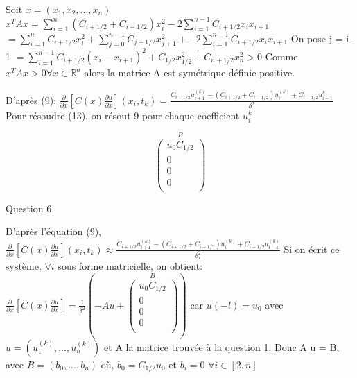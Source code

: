 \documentclass[a4paper,11pt]{article}
\newcommand{\R}{\mathbb{R}}
\theoremstyle{nonumberplain}
\theoremstyle{nonumberplain}
\theoremstyle{nonumberplain}
\begin{document}
    Soit $x = (x_1, x_2, ... , x_n)$
    \newline
    $x^TAx = \sum\limits_{i = 1}^{n} (C_{i+1/2} + C_{i-1/2}) x_i^2 - 2 \sum\limits_{i = 1}^{n-1} C_{i+1/2} x_i x_{i+1} $
    \newline
    $ = \sum\limits_{i = 1}^{n} C_{i+1/2} x_i^2 + \sum\limits_{j = 0}^{n-1} C_{j+1/2} x_{j+1}^2  + - 2 \sum\limits_{i = 1}^{n-1} C_{i+1/2} x_i x_{i+1} $ On pose j = i-1
    \newline
    $ = \sum\limits_{i = 1}^{n-1} C_{i+1/2} (x_i - x_{i+1})^2 + C_{1/2} x_{1/2}^2 + C_{n + 1/2} x_{n}^2 > 0 $
    \newline
    Comme $x^TAx > 0 \forall x \in \R ^n $ alors la matrice A est symétrique définie positive.
    \newline

    D'après (9):
    $ \frac{\partial}{\partial x}[C(x)\frac{\partial u}{\partial x}](x_i, t_k) = \frac{
    C_{i+1/2}u_{i+1}^{(k)} - (C_{i+1/2} + C_{i-1/2})u_i^{(k)}+C_{i-1/2}u_{i-1}^{k}}{\delta^{2}}$
    Pour résoudre (13), on résout 9 pour chaque coefficient $u_i^{k}$

    $$
    \overset{B} {
        \begin{pmatrix}
            u_0 C_{1/2} \\
            0 \\
            0 \\
            0 \\
        \end{pmatrix}
    }
    $$

    Question 6.

    D'après l'équation (9),
    \newline
    $ \frac{\partial }{\partial x} [C(x)\frac{\partial u }{\partial x}](x_i, t_k) \approx \frac{C_{i+1/2}u_{i+1}^{(k)} - (C_{i+1/2} + C_{i-1/2})u_i^{(k)} + C_{i-1/2}u_{i-1}^{(k)}}{\delta_x^2} $
    \newline
    Si on écrit ce système, $\forall i $ sous forme matricielle, on obtient:
    \newline
    $ \frac{\partial }{\partial x} [C(x)\frac{\partial u }{\partial x}] = \frac{1}{\delta ^2} (-A u +
    \overset{B} {
        \begin{pmatrix}
            u_0 C_{1/2} \\
            0 \\
            0 \\
            0 \\
        \end{pmatrix}
    })$
    car $u(-l) = u_0$
    avec $u = (u_1^{(k)}, ... , u_n^{(k)}) $
    et A la matrice trouvée à la question 1.
    \newline
    Donc A u = B, avec $B = (b_0, ..., b_n)$
    où, $b_0 = C_{1/2} u_0$
    et $b_i = 0$  $\forall i \in [2, n] $
    \newline
\end{document}
